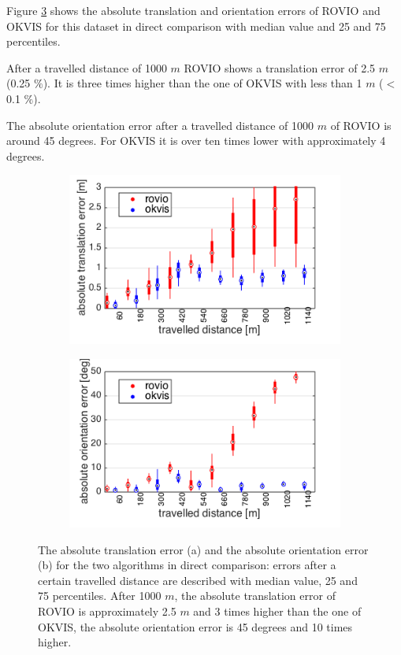Figure \ref{pics:ijrr_abs} shows the absolute translation and orientation errors of ROVIO and OKVIS for this dataset in direct comparison with median value and 25 and 75 percentiles.

After a travelled distance of 1000 $m$ ROVIO shows a translation error of 2.5 $m$ (0.25 $\%$). It is three times higher than the one of OKVIS with less than 1 $m$ ($<$0.1 $\%$). 

The absolute orientation error after a travelled distance of 1000 $m$ of ROVIO is around 45 degrees. For OKVIS it is over ten times lower with approximately 4 degrees. \\

\begin{figure}[h]
  \begin{subfigure}[b]{0.48\textwidth}
    \includegraphics[width=\textwidth]{images/ijrr/ate.png}
    \caption{}
    \label{fig:2}
  \end{subfigure}
  \hfill
  \begin{subfigure}[b]{0.48\textwidth}
    \includegraphics[width=\textwidth]{images/ijrr/aoe.png}
    \caption{}
    \label{fig:2}
  \end{subfigure}
   \caption{The absolute translation error (a) and the absolute orientation error (b) for the two algorithms in direct comparison: errors after a certain travelled distance are described with median value, 25 and 75 percentiles. After 1000 $m$, the absolute translation error of ROVIO is approximately 2.5 $m$ and 3 times higher than the one of OKVIS, the absolute orientation error is 45 degrees and 10 times higher.}
   \label{pics:ijrr_abs}
\end{figure}

